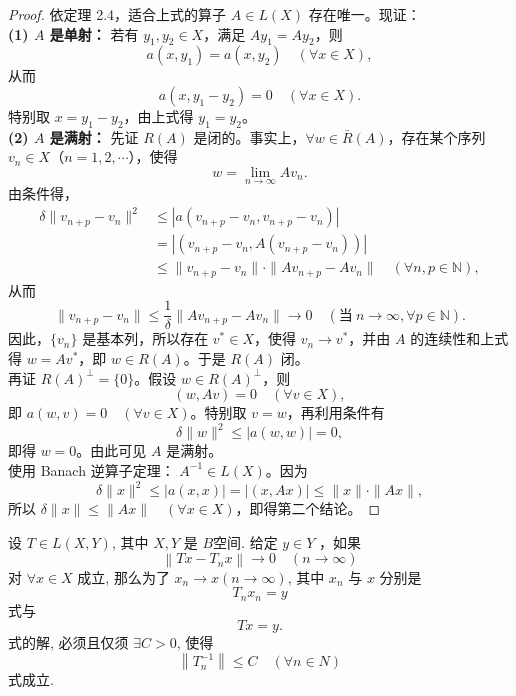 \documentclass[lang=cn,newtx,10pt,scheme=chinese,thmcnt=chapter]{elegantbook}
\begin{document}
\begin{proof}
依定理 2.4，适合上式的算子 $A \in L(X)$ 存在唯一。现证：\\
\textbf{(1) $A$ 是单射：} 若有 $y_1, y_2 \in X$，满足 $A y_1 = A y_2$，则
\[
a(x, y_1) = a(x, y_2) \quad (\forall x \in X),
\]
从而
\[
a(x, y_1 - y_2) = 0 \quad (\forall x \in X).
\]
特别取 $x = y_1 - y_2$，由上式得 $y_1 = y_2$。\\
\textbf{(2) $A$ 是满射：} 先证 $R(A)$ 是闭的。事实上，$\forall w \in \bar{R}(A)$，存在某个序列 $v_n \in X$（$n = 1, 2, \cdots$），使得
\[
w = \lim_{n \to \infty} A v_n.
\]
由条件得，
\[
\begin{aligned}
\delta \|v_{n+p} - v_n\|^2 &\leqslant |a(v_{n+p} - v_n, v_{n+p} - v_n)| \\
&= |(v_{n+p} - v_n, A(v_{n+p} - v_n))| \\
&\leqslant \|v_{n+p} - v_n\| \cdot \|A v_{n+p} - A v_n\| \quad (\forall n, p \in \mathbb{N}),
\end{aligned}
\]
从而
\[
\|v_{n+p} - v_n\| \leqslant \frac{1}{\delta} \|A v_{n+p} - A v_n\| \to 0 \quad (\text{当} \ n \to \infty, \forall p \in \mathbb{N}).
\]
因此，$\{v_n\}$ 是基本列，所以存在 $v^* \in X$，使得 $v_n \to v^*$，并由 $A$ 的连续性和上式得 $w = A v^*$，即 $w \in R(A)$。于是 $R(A)$ 闭。\\
再证 $R(A)^{\perp} = \{0\}$。假设 $w \in R(A)^{\perp}$，则
\[
(w, A v) = 0 \quad (\forall v \in X),
\]
即 $a(w, v) = 0 \quad (\forall v \in X)$。特别取 $v = w$，再利用条件有
\[
\delta \|w\|^2 \leqslant |a(w, w)| = 0,
\]
即得 $w = 0$。由此可见 $A$ 是满射。\\使用 Banach 逆算子定理： $A^{-1} \in L(X)$。因为
\[
\delta \|x\|^2 \leqslant |a(x, x)| = |(x, A x)| \leqslant \|x\| \cdot \|A x\|,
\]
所以 $\delta \|x\| \leqslant \|A x\| \quad (\forall x \in X)$，即得第二个结论。
\end{proof}
\begin{theorem}设 $T \in L ( X , Y )$, 其中 $X , Y$ 是 $B$空间. 给定 $y \in Y$ ，如果\begin{equation*}
\left\|T x-T_n x\right\| \rightarrow 0 \quad(n \rightarrow \infty)
\end{equation*}
对 $\forall x \in X$ 成立, 那么为了 $x_n \rightarrow x(n \rightarrow \infty)$, 其中 $x_n$ 与 $x$ 分别是\begin{equation*}
T_n x_n=y
\end{equation*}式与\begin{equation*}
T x=y .
\end{equation*}式的解, 必须且仅须 $\exists C>0$, 使得\begin{equation*}
\left\|T_n^{-1}\right\| \leqslant C \quad(\forall n \in N )
\end{equation*}式成立.
\end{theorem}
\end{document}
